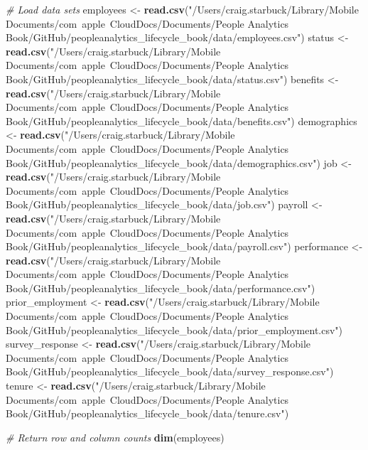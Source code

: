 \documentclass[]{book}
\newenvironment{Shaded}{\begin{snugshade}}{\end{snugshade}}
\newcommand{\CommentTok}[1]{\textcolor[rgb]{0.56,0.35,0.01}{\textit{#1}}}
\newcommand{\KeywordTok}[1]{\textcolor[rgb]{0.13,0.29,0.53}{\textbf{#1}}}
\newcommand{\NormalTok}[1]{#1}
\newcommand{\StringTok}[1]{\textcolor[rgb]{0.31,0.60,0.02}{#1}}
\begin{document}
\begin{Shaded}
\begin{Highlighting}[]
\CommentTok{# Load data sets}
\NormalTok{employees <-}\StringTok{ }\KeywordTok{read.csv}\NormalTok{(}\StringTok{"/Users/craig.starbuck/Library/Mobile Documents/com~apple~CloudDocs/Documents/People Analytics Book/GitHub/peopleanalytics_lifecycle_book/data/employees.csv"}\NormalTok{)}
\NormalTok{status <-}\StringTok{ }\KeywordTok{read.csv}\NormalTok{(}\StringTok{"/Users/craig.starbuck/Library/Mobile Documents/com~apple~CloudDocs/Documents/People Analytics Book/GitHub/peopleanalytics_lifecycle_book/data/status.csv"}\NormalTok{)}
\NormalTok{benefits <-}\StringTok{ }\KeywordTok{read.csv}\NormalTok{(}\StringTok{"/Users/craig.starbuck/Library/Mobile Documents/com~apple~CloudDocs/Documents/People Analytics Book/GitHub/peopleanalytics_lifecycle_book/data/benefits.csv"}\NormalTok{)}
\NormalTok{demographics <-}\StringTok{ }\KeywordTok{read.csv}\NormalTok{(}\StringTok{"/Users/craig.starbuck/Library/Mobile Documents/com~apple~CloudDocs/Documents/People Analytics Book/GitHub/peopleanalytics_lifecycle_book/data/demographics.csv"}\NormalTok{)}
\NormalTok{job <-}\StringTok{ }\KeywordTok{read.csv}\NormalTok{(}\StringTok{"/Users/craig.starbuck/Library/Mobile Documents/com~apple~CloudDocs/Documents/People Analytics Book/GitHub/peopleanalytics_lifecycle_book/data/job.csv"}\NormalTok{)}
\NormalTok{payroll <-}\StringTok{ }\KeywordTok{read.csv}\NormalTok{(}\StringTok{"/Users/craig.starbuck/Library/Mobile Documents/com~apple~CloudDocs/Documents/People Analytics Book/GitHub/peopleanalytics_lifecycle_book/data/payroll.csv"}\NormalTok{)}
\NormalTok{performance <-}\StringTok{ }\KeywordTok{read.csv}\NormalTok{(}\StringTok{"/Users/craig.starbuck/Library/Mobile Documents/com~apple~CloudDocs/Documents/People Analytics Book/GitHub/peopleanalytics_lifecycle_book/data/performance.csv"}\NormalTok{)}
\NormalTok{prior_employment <-}\StringTok{ }\KeywordTok{read.csv}\NormalTok{(}\StringTok{"/Users/craig.starbuck/Library/Mobile Documents/com~apple~CloudDocs/Documents/People Analytics Book/GitHub/peopleanalytics_lifecycle_book/data/prior_employment.csv"}\NormalTok{)}
\NormalTok{survey_response <-}\StringTok{ }\KeywordTok{read.csv}\NormalTok{(}\StringTok{"/Users/craig.starbuck/Library/Mobile Documents/com~apple~CloudDocs/Documents/People Analytics Book/GitHub/peopleanalytics_lifecycle_book/data/survey_response.csv"}\NormalTok{)}
\NormalTok{tenure <-}\StringTok{ }\KeywordTok{read.csv}\NormalTok{(}\StringTok{"/Users/craig.starbuck/Library/Mobile Documents/com~apple~CloudDocs/Documents/People Analytics Book/GitHub/peopleanalytics_lifecycle_book/data/tenure.csv"}\NormalTok{)}

\CommentTok{# Return row and column counts}
\KeywordTok{dim}\NormalTok{(employees)}
\end{Highlighting}
\end{Shaded}
\end{document}
